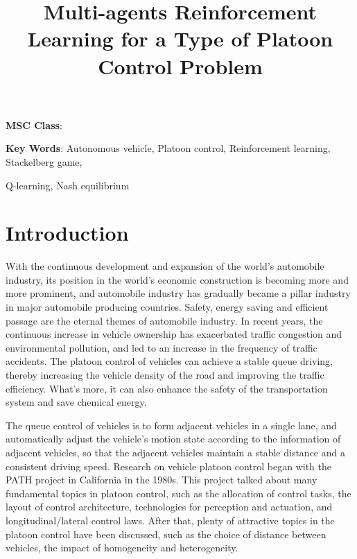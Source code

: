\documentclass{article}
\title{Multi-agents Reinforcement Learning for a Type of Platoon Control Problem}
\begin{document}
\maketitle

\begin{abstract}


\end{abstract}



\hspace{.2in} {\bf MSC Class}: 

\hspace{.2in} {\bf Key Words}: Autonomous vehicle, Platoon control, Reinforcement learning, Stackelberg game,

\hspace{1.1in}  
Q-learning, Nash equilibrium



\newpage

\section{Introduction}

With the continuous development and expansion of the world's automobile industry, its position in the world's economic construction is becoming more and more prominent, and automobile industry has gradually became a pillar industry in major automobile producing countries.  Safety, energy saving and efficient passage are the eternal themes of automobile industry. In recent years, the continuous increase in vehicle ownership has exacerbated traffic congestion and environmental pollution, and led to an increase in the frequency of traffic accidents. The platoon control of vehicles can achieve a stable queue driving, thereby increasing the vehicle density of the road and improving the traffic efficiency. What's more, it can also enhance the safety of the transportation system and save chemical energy.

The queue control of vehicles is to form adjacent vehicles in a single lane, and automatically adjust the vehicle's motion state according to the information of adjacent vehicles, so that the adjacent vehicles maintain a stable distance and a consistent driving speed. Research on vehicle platoon control began with the PATH project in California in the 1980s. This project talked about many fundamental topics in platoon control, such as the allocation of control tasks, the layout of control architecture, technologies for perception and actuation, and longitudinal/lateral control laws. After that, plenty of attractive topics in the platoon control have been discussed, such as the choice of distance between vehicles, the impact of homogeneity and heterogeneity. 
\end{document}

